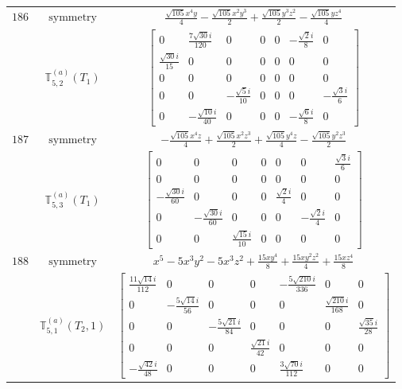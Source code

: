 \documentclass[fleqn,8pt,landscape]{jsarticle}
\begin{document}
\begin{longtable}{ccc}
$ 186 $ & $ \text{symmetry} $ & $ \frac{\sqrt{105} x^{4} y}{4} - \frac{\sqrt{105} x^{2} y^{3}}{2} + \frac{\sqrt{105} y^{3} z^{2}}{2} - \frac{\sqrt{105} y z^{4}}{4} $ \\
$  $ & $ \mathbb{T}_{5,2}^{(a)}(T_{1}) $ & $ \begin{bmatrix} 0 & \frac{7 \sqrt{30} i}{120} & 0 & 0 & 0 & - \frac{\sqrt{2} i}{8} & 0 \\ \frac{\sqrt{30} i}{15} & 0 & 0 & 0 & 0 & 0 & 0 \\ 0 & 0 & 0 & 0 & 0 & 0 & 0 \\ 0 & 0 & - \frac{\sqrt{5} i}{10} & 0 & 0 & 0 & - \frac{\sqrt{3} i}{6} \\ 0 & - \frac{\sqrt{10} i}{40} & 0 & 0 & 0 & - \frac{\sqrt{6} i}{8} & 0 \end{bmatrix} $ \\ \hline
$ 187 $ & $ \text{symmetry} $ & $ - \frac{\sqrt{105} x^{4} z}{4} + \frac{\sqrt{105} x^{2} z^{3}}{2} + \frac{\sqrt{105} y^{4} z}{4} - \frac{\sqrt{105} y^{2} z^{3}}{2} $ \\
$  $ & $ \mathbb{T}_{5,3}^{(a)}(T_{1}) $ & $ \begin{bmatrix} 0 & 0 & 0 & 0 & 0 & 0 & \frac{\sqrt{3} i}{6} \\ 0 & 0 & 0 & 0 & 0 & 0 & 0 \\ - \frac{\sqrt{30} i}{60} & 0 & 0 & 0 & \frac{\sqrt{2} i}{4} & 0 & 0 \\ 0 & - \frac{\sqrt{30} i}{60} & 0 & 0 & 0 & - \frac{\sqrt{2} i}{4} & 0 \\ 0 & 0 & \frac{\sqrt{15} i}{10} & 0 & 0 & 0 & 0 \end{bmatrix} $ \\ \hline
$ 188 $ & $ \text{symmetry} $ & $ x^{5} - 5 x^{3} y^{2} - 5 x^{3} z^{2} + \frac{15 x y^{4}}{8} + \frac{15 x y^{2} z^{2}}{4} + \frac{15 x z^{4}}{8} $ \\
$  $ & $ \mathbb{T}_{5,1}^{(a)}(T_{2},1) $ & $ \begin{bmatrix} \frac{11 \sqrt{14} i}{112} & 0 & 0 & 0 & - \frac{5 \sqrt{210} i}{336} & 0 & 0 \\ 0 & - \frac{5 \sqrt{14} i}{56} & 0 & 0 & 0 & \frac{\sqrt{210} i}{168} & 0 \\ 0 & 0 & - \frac{5 \sqrt{21} i}{84} & 0 & 0 & 0 & \frac{\sqrt{35} i}{28} \\ 0 & 0 & 0 & \frac{\sqrt{21} i}{42} & 0 & 0 & 0 \\ - \frac{\sqrt{42} i}{48} & 0 & 0 & 0 & \frac{3 \sqrt{70} i}{112} & 0 & 0 \end{bmatrix} $ \\ \hline

\end{longtable}
\end{document}

